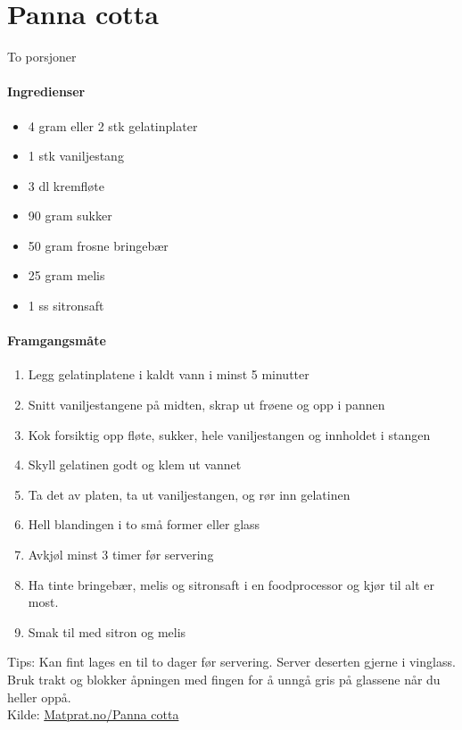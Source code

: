 \section{﻿Panna cotta}
\label{pannacotta}
To porsjoner

\paragraph{Ingredienser}
\begin{itemize}[noitemsep]
	\item 4 gram eller 2 stk gelatinplater
	\item 1 stk vaniljestang
	\item 3 dl kremfløte
	\item 90 gram sukker
	\item 50 gram frosne bringebær
	\item 25 gram melis
	\item 1 ss sitronsaft
\end{itemize}

\paragraph{Framgangsmåte}
\begin{enumerate}[noitemsep]
	\item Legg gelatinplatene i kaldt vann i minst 5 minutter
	\item Snitt vaniljestangene på midten, skrap ut frøene og opp i pannen
	\item Kok forsiktig opp fløte, sukker, hele vaniljestangen og innholdet i stangen
	\item Skyll gelatinen godt og klem ut vannet
	\item Ta det av platen, ta ut vaniljestangen, og rør inn gelatinen
	\item Hell blandingen i to små former eller glass
	\item Avkjøl minst 3 timer før servering
	\item Ha tinte bringebær, melis og sitronsaft i en foodprocessor og kjør til alt er most.
	\item Smak til med sitron og melis
\end{enumerate}


Tips: Kan fint lages en til to dager før servering. Server deserten gjerne i vinglass. Bruk trakt og blokker åpningen med fingen for å unngå gris på glassene når du heller oppå.\\

Kilde: \href{http://www.matprat.no/gjester/gjesteoppskrifter/panna-cotta/}{Matprat.no/Panna cotta}
